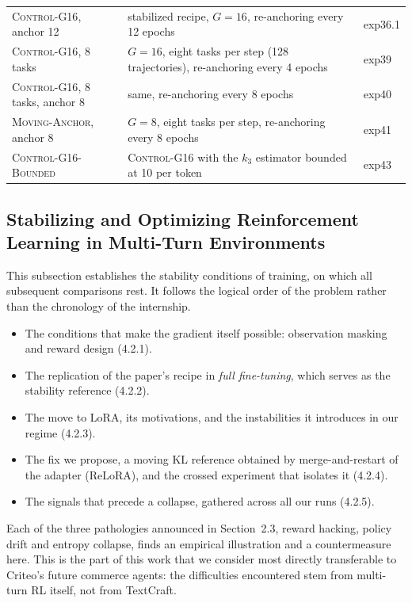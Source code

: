 \documentclass[11pt,a4paper]{article}
\begin{document}
\begin{table}[htbp]
\begin{tabular}{l p{7.2cm} l}
\textsc{Control-G16}, anchor 12 & stabilized recipe, $G=16$, re-anchoring every 12 epochs & exp36.1 \\
\textsc{Control-G16}, 8 tasks & $G=16$, eight tasks per step (128 trajectories), re-anchoring every 4 epochs & exp39 \\
\textsc{Control-G16}, 8 tasks, anchor 8 & same, re-anchoring every 8 epochs & exp40 \\
\textsc{Moving-Anchor}, anchor 8 & $G=8$, eight tasks per step, re-anchoring every 8 epochs & exp41 \\
\textsc{Control-G16-Bounded} & \textsc{Control-G16} with the $k_3$ estimator bounded at 10 per token & exp43 \\
\bottomrule
\end{tabular}
\end{table}




\vspace{2cm}

\subsection{Stabilizing and Optimizing Reinforcement Learning in Multi-Turn Environments}
\label{subsec:stabilisation}

This subsection establishes the stability conditions of training, on which all subsequent comparisons rest. It follows the logical order of the problem rather than the chronology of the internship.

\begin{itemize}
    \item The conditions that make the gradient itself possible: observation masking and reward design (4.2.1).
    \item The replication of the paper's recipe in \emph{full fine-tuning}, which serves as the stability reference (4.2.2).
    \item The move to LoRA, its motivations, and the instabilities it introduces in our regime (4.2.3).
    \item The fix we propose, a moving KL reference obtained by merge-and-restart of the adapter (ReLoRA), and the crossed experiment that isolates it (4.2.4).
    \item The signals that precede a collapse, gathered across all our runs (4.2.5).
\end{itemize}

Each of the three pathologies announced in Section~2.3, reward hacking, policy drift and entropy collapse, finds an empirical illustration and a countermeasure here. This is the part of this work that we consider most directly transferable to Criteo's future commerce agents: the difficulties encountered stem from multi-turn RL itself, not from TextCraft.
\end{document}

